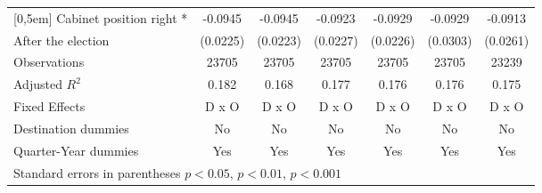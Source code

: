 \begin{table}[htbp]
\begin{tabular}{l*{6}{c}}
[0,5em]
Cabinet position right * &     -0.0945\sym{***}&     -0.0945\sym{***}&     -0.0923\sym{***}&     -0.0929\sym{***}&     -0.0929\sym{**} &     -0.0913\sym{***}\\
After the election                    &    (0.0225)         &    (0.0223)         &    (0.0227)         &    (0.0226)         &    (0.0303)         &    (0.0261)         \\
\hline
Observations        &       23705         &       23705         &       23705         &       23705         &       23705         &       23239         \\
Adjusted \(R^{2}\)  &       0.182         &       0.168         &       0.177         &       0.176         &       0.176         &       0.175         \\
Fixed Effects       &       D x O         &       D x O         &       D x O         &       D x O         &       D x O         &       D x O         \\
Destination dummies &          No         &          No         &          No         &          No         &          No         &          No         \\
Quarter-Year dummies&         Yes         &         Yes         &         Yes         &         Yes         &         Yes         &         Yes         \\
\hline\hline
\multicolumn{7}{l}{Standard errors in parentheses \sym{*} \(p<0.05\), \sym{**} \(p<0.01\), \sym{***} \(p<0.001\)}\\
\end{tabular}
\end{table}
